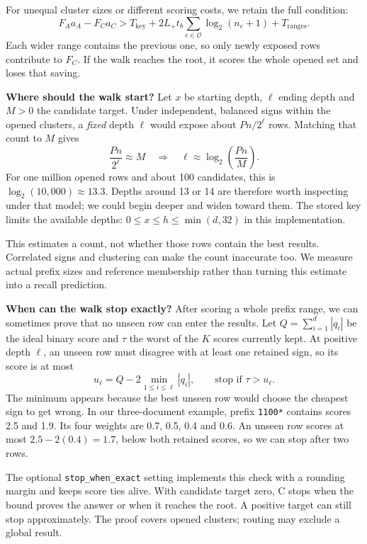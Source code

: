 For unequal cluster sizes or different scoring costs, we retain the full condition:
\[
 \boxed{F_Aa_A-F_Ca_C>T_{\mathrm{key}}+
 2L_+t_b\sum_{c\in\mathcal O}\log_2(n_c+1)+T_{\mathrm{ranges}}.}
\]
Each wider range contains the previous one, so only newly exposed rows contribute to $F_C$. If the walk reaches the root, it scores the whole opened set and loses that saving.

\textbf{Where should the walk start?}
Let $x$ be starting depth, $\ell$ ending depth and $M>0$ the candidate target. Under independent, balanced signs within the opened clusters, a \emph{fixed} depth $\ell$ would expose about $Pn/2^\ell$ rows. Matching that count to $M$ gives
\[
 \frac{Pn}{2^\ell}\approx M
 \quad\Longrightarrow\quad
 \boxed{\ell\approx\log_2\!\left(\frac{Pn}{M}\right).}
\]
For one million opened rows and about 100 candidates, this is $\log_2(10{,}000)\approx13.3$. Depths around 13 or 14 are therefore worth inspecting under that model; we could begin deeper and widen toward them. The stored key limits the available depths: $0\le x\le h\le\min(d,32)$ in this implementation.

This estimates a count, not whether those rows contain the best results. Correlated signs and clustering can make the count inaccurate too. We measure actual prefix sizes and reference membership rather than turning this estimate into a recall prediction.

\textbf{When can the walk stop exactly?}
After scoring a whole prefix range, we can sometimes prove that no unseen row can enter the results. Let $Q=\sum_{i=1}^{d}|q_i|$ be the ideal binary score and $\tau$ the worst of the $K$ scores currently kept. At positive depth $\ell$, an unseen row must disagree with at least one retained sign, so its score is at most
\[
 u_\ell=Q-2\min_{1\le i\le\ell}|q_i|,
 \qquad \boxed{\text{stop if }\tau>u_\ell.}
\]
The minimum appears because the best unseen row would choose the cheapest sign to get wrong. In our three-document example, prefix \texttt{1100*} contains scores 2.5 and 1.9. Its four weights are 0.7, 0.5, 0.4 and 0.6. An unseen row scores at most $2.5-2(0.4)=1.7$, below both retained scores, so we can stop after two rows.

The optional \texttt{stop\_when\_exact} setting implements this check with a rounding margin and keeps score ties alive. With candidate target zero, C stops when the bound proves the answer or when it reaches the root. A positive target can still stop approximately. The proof covers opened clusters; routing may exclude a global result.

